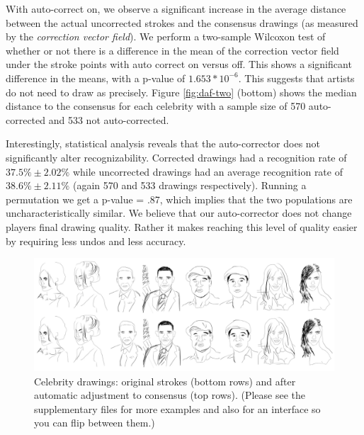  
With auto-correct on,  we observe a significant increase in the average distance between the actual uncorrected strokes
and the consensus drawings (as measured by the \emph{correction vector field}). We perform a two-sample Wilcoxon test of
whether or not there is a difference in the mean of the correction vector field under the stroke points with auto correct
on versus off. This shows a significant difference in the means, with a p-value of $1.653*10^{-6}$.  This suggests that
artists do not need to draw as precisely. Figure \ref{fig:daf-two} (bottom) shows the median distance to the consensus for
each celebrity with a sample size of 570 auto-corrected and 533 not auto-corrected.
 

Interestingly, statistical analysis reveals that the auto-corrector does not significantly alter recognizability.
Corrected drawings had a recognition rate of $37.5\% \pm 2.02\%$ while uncorrected drawings had an average recognition
rate of $38.6\% \pm 2.11\%$ (again 570 and 533 drawings respectively). Running a permutation we get a p-value = .87, which implies that the two populations are uncharacteristically similar. We believe that our auto-corrector does not change
players final drawing quality. Rather it makes reaching this level of quality easier by requiring less undos and less
accuracy.

\begin{figure}[!t]
  \centering%
\includegraphics[width=7in]{./figures/ResultsAll_16.pdf}
\vspace{-0.35in}
  \caption{Celebrity drawings: original strokes (bottom rows) and after automatic adjustment to consensus (top rows). (Please see the supplementary files for more examples and also for an interface so you can flip between them.)}
\vspace{-0.25in}
  \label{fig:results}
\end{figure}

